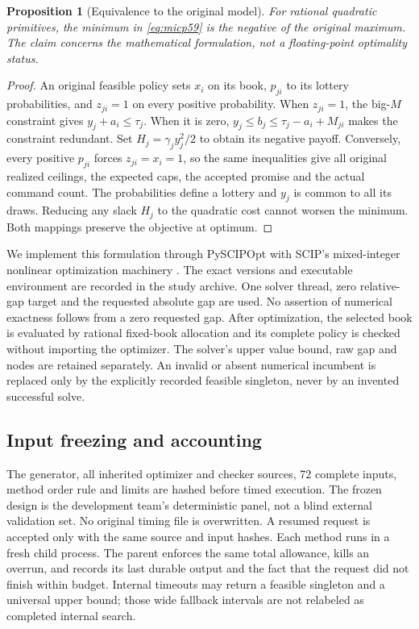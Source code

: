 \documentclass[11pt,letterpaper]{article}
\newtheorem{proposition}[theorem]{Proposition}
\theoremstyle{definition}\newtheorem{remark}[theorem]{Remark}
\begin{document}
\begin{proposition}[Equivalence to the original model]\label{prop:micp59}
For rational quadratic primitives, the minimum in \eqref{eq:micp59} is the negative of the original maximum. The claim concerns the mathematical formulation, not a floating-point optimality status.
\end{proposition}
\begin{proof}
An original feasible policy sets $x_i$ on its book, $p_{ji}$ to its lottery probabilities, and $z_{ji}=1$ on every positive probability. When $z_{ji}=1$, the big-$M$ constraint gives $y_j+a_i\leq\tau_j$. When it is zero, $y_j\leq b_j\leq\tau_j-a_i+M_{ji}$ makes the constraint redundant. Set $H_j=\gamma_jy_j^2/2$ to obtain its negative payoff. Conversely, every positive $p_{ji}$ forces $z_{ji}=x_i=1$, so the same inequalities give all original realized ceilings, the expected caps, the accepted promise and the actual command count. The probabilities define a lottery and $y_j$ is common to all its draws. Reducing any slack $H_j$ to the quadratic cost cannot worsen the minimum. Both mappings preserve the objective at optimum.
\end{proof}

We implement this formulation through PySCIPOpt \citep{Maher2016} with SCIP's mixed-integer nonlinear optimization machinery \citep{Bolusani2024}. The exact versions and executable environment are recorded in the study archive. One solver thread, zero relative-gap target and the requested absolute gap are used. No assertion of numerical exactness follows from a zero requested gap. After optimization, the selected book is evaluated by rational fixed-book allocation and its complete policy is checked without importing the optimizer. The solver's upper value bound, raw gap and nodes are retained separately. An invalid or absent numerical incumbent is replaced only by the explicitly recorded feasible singleton, never by an invented successful solve.

\subsection{Input freezing and accounting}
The generator, all inherited optimizer and checker sources, 72 complete inputs, method order rule and limits are hashed before timed execution. The frozen design is the development team's deterministic panel, not a blind external validation set. No original timing file is overwritten. A resumed request is accepted only with the same source and input hashes. Each method runs in a fresh child process. The parent enforces the same total allowance, kills an overrun, and records its last durable output and the fact that the request did not finish within budget. Internal timeouts may return a feasible singleton and a universal upper bound; those wide fallback intervals are not relabeled as completed internal search.
\end{document}
